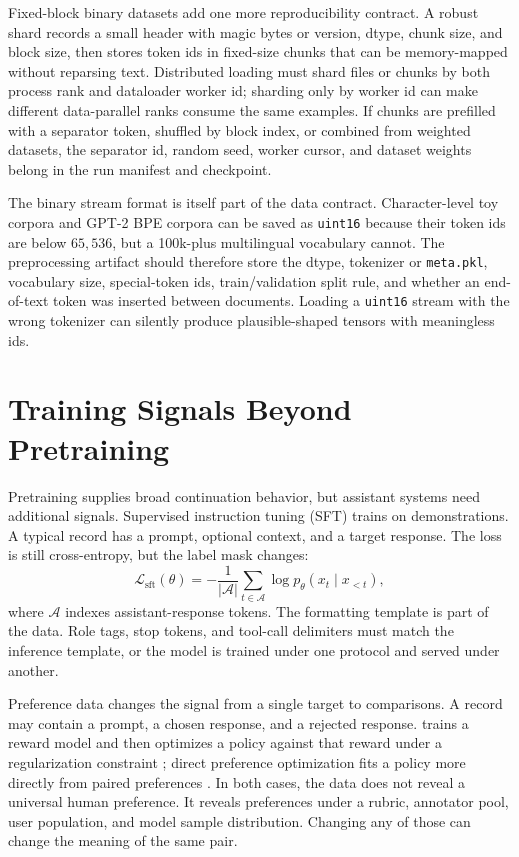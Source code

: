 Fixed-block binary datasets add one more reproducibility contract. A robust shard records a small header with magic bytes or version, dtype, chunk size, and block size, then stores token ids in fixed-size chunks that can be memory-mapped without reparsing text. Distributed loading must shard files or chunks by both process rank and dataloader worker id; sharding only by worker id can make different data-parallel ranks consume the same examples. If chunks are prefilled with a separator token, shuffled by block index, or combined from weighted datasets, the separator id, random seed, worker cursor, and dataset weights belong in the run manifest and checkpoint.

The binary stream format is itself part of the data contract. Character-level toy corpora and GPT-2 BPE corpora can be saved as \texttt{uint16} because their token ids are below $65{,}536$, but a 100k-plus multilingual vocabulary cannot. The preprocessing artifact should therefore store the dtype, tokenizer or \texttt{meta.pkl}, vocabulary size, special-token ids, train/validation split rule, and whether an end-of-text token was inserted between documents. Loading a \texttt{uint16} stream with the wrong tokenizer can silently produce plausible-shaped tensors with meaningless ids.

\section{Training Signals Beyond Pretraining}
\label{sec:training-signals-beyond-pretraining}

Pretraining supplies broad continuation behavior, but assistant systems need additional signals. Supervised instruction tuning (SFT) trains on demonstrations. A typical record has a prompt, optional context, and a target response. The loss is still cross-entropy, but the label mask changes:
\begin{equation}
  \mathcal{L}_{\mathrm{sft}}(\theta)
  = -\frac{1}{|\mathcal{A}|}\sum_{t\in \mathcal{A}}
      \log p_{\theta}(x_t \mid x_{<t}),
\end{equation}
where $\mathcal{A}$ indexes assistant-response tokens. The formatting template is part of the data. Role tags, stop tokens, and tool-call delimiters must match the inference template, or the model is trained under one protocol and served under another.

Preference data changes the signal from a single target to comparisons. A record may contain a prompt, a chosen response, and a rejected response. \rlhf trains a reward model and then optimizes a policy against that reward under a regularization constraint \cite{ouyang2022training}; direct preference optimization fits a policy more directly from paired preferences \cite{rafailov2023direct}. In both cases, the data does not reveal a universal human preference. It reveals preferences under a rubric, annotator pool, user population, and model sample distribution. Changing any of those can change the meaning of the same pair.

